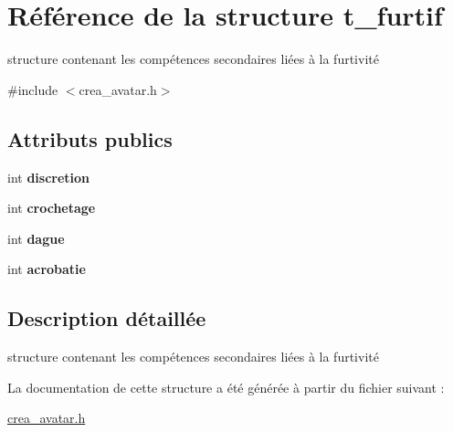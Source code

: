\hypertarget{structt__furtif}{\section{Référence de la structure t\-\_\-furtif}
\label{structt__furtif}
}


structure contenant les compétences secondaires liées à la furtivité  




{\ttfamily \#include $<$crea\-\_\-avatar.\-h$>$}

\subsection*{Attributs publics}
\begin{DoxyCompactItemize}
\item 
\hypertarget{structt__furtif_ad21f45858143b827832161fe73d57e44}{int {\bfseries discretion}}\label{structt__furtif_ad21f45858143b827832161fe73d57e44}

\item 
\hypertarget{structt__furtif_ae38ee7b3bba00e8a28ecbbea451f8b35}{int {\bfseries crochetage}}\label{structt__furtif_ae38ee7b3bba00e8a28ecbbea451f8b35}

\item 
\hypertarget{structt__furtif_ada6b5070e9266a55f8fa866a482c1d48}{int {\bfseries dague}}\label{structt__furtif_ada6b5070e9266a55f8fa866a482c1d48}

\item 
\hypertarget{structt__furtif_a3611b6746f5f3179d57e3939d970c2f6}{int {\bfseries acrobatie}}\label{structt__furtif_a3611b6746f5f3179d57e3939d970c2f6}

\end{DoxyCompactItemize}


\subsection{Description détaillée}
structure contenant les compétences secondaires liées à la furtivité 

La documentation de cette structure a été générée à partir du fichier suivant \-:\begin{DoxyCompactItemize}
\item 
\hyperlink{crea__avatar_8h}{crea\-\_\-avatar.\-h}\end{DoxyCompactItemize}
